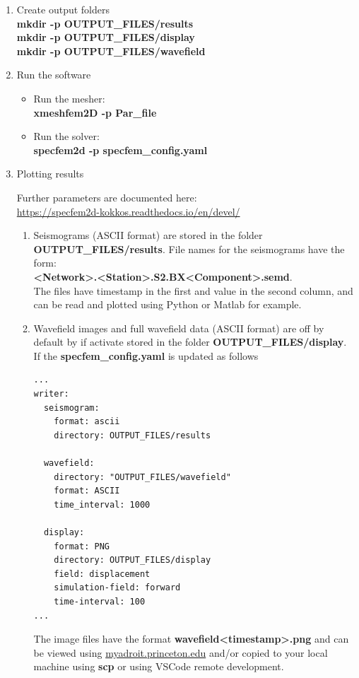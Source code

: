 \documentclass[11pt,titlepage,fleqn]{article}
\begin{document}
\begin{enumerate}
\item Create output folders\\
      {\bf mkdir -p OUTPUT\_FILES/results}\\
      {\bf mkdir -p OUTPUT\_FILES/display}\\
      {\bf mkdir -p OUTPUT\_FILES/wavefield}
      
\item Run the software
  \begin{itemize}
    \item Run the mesher:\\
          {\bf xmeshfem2D -p Par\_file}
    \item Run the solver:\\
          {\bf specfem2d -p specfem\_config.yaml}
  \end{itemize}

\item  Plotting results

\noindent Further parameters are documented here:\\
\phantom{ } \url{https://specfem2d-kokkos.readthedocs.io/en/devel/}

  \begin{enumerate}
    \item Seismograms (ASCII format) are stored in the folder {\bf OUTPUT\_FILES/results}. File names for the seismograms have the form: \\
        {\bf  <Network>.<Station>.S2.BX<Component>.semd}. \\
        The files have timestamp in the first and value in the second column, and can be read and plotted using Python or Matlab for example.

    \item Wavefield images and full wavefield data (ASCII format) are off by default by if activate stored in the folder {\bf OUTPUT\_FILES/display}. If the {\bf specfem\_config.yaml} is updated as follows


\newpage
\begin{lstlisting}
...
writer:
  seismogram:
    format: ascii
    directory: OUTPUT_FILES/results

  wavefield:
    directory: "OUTPUT_FILES/wavefield"
    format: ASCII
    time_interval: 1000

  display:
    format: PNG
    directory: OUTPUT_FILES/display
    field: displacement
    simulation-field: forward
    time-interval: 100
...
\end{lstlisting}
         The image files have the format {\bf wavefield<timestamp>.png} and can be viewed using \url{myadroit.princeton.edu} and/or copied to your local machine using {\bf scp} or using VSCode remote development.
   
  \end{enumerate}

\end{enumerate}
\end{document}
